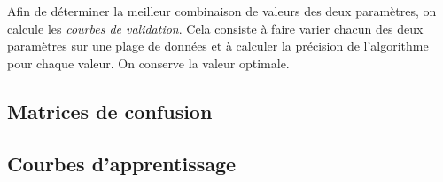 Afin de déterminer la meilleur combinaison de valeurs des deux paramètres, on calcule les \emph{courbes de validation}. Cela consiste à faire varier chacun des deux paramètres sur une plage de données et à calculer la précision de l'algorithme pour chaque valeur. On conserve la valeur optimale. 

\subsection{Matrices de confusion}
\label{Industrialisation du produit: Performances de la solution:Matrices de confusion}

\subsection{Courbes d'apprentissage}
\label{Industrialisation du produit: Performances de la solution:Courbes d'apprentissage}